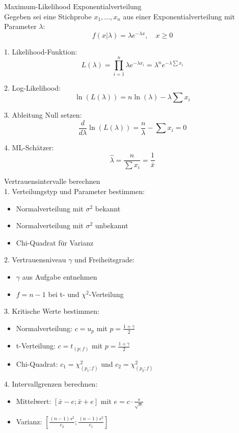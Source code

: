 \begin{example2}{Maximum-Likelihood Exponentialverteilung}\\
Gegeben sei eine Stichprobe $x_1,...,x_n$ aus einer Exponentialverteilung mit Parameter $\lambda$:
$$f(x|\lambda) = \lambda e^{-\lambda x}, \quad x \geq 0$$

1. Likelihood-Funktion:
$$L(\lambda) = \prod_{i=1}^n \lambda e^{-\lambda x_i} = \lambda^n e^{-\lambda \sum x_i}$$

2. Log-Likelihood:
$$\ln(L(\lambda)) = n\ln(\lambda) - \lambda \sum x_i$$

3. Ableitung Null setzen:
$$\frac{d}{d\lambda}\ln(L(\lambda)) = \frac{n}{\lambda} - \sum x_i = 0$$

4. ML-Schätzer:
$$\hat{\lambda} = \frac{n}{\sum x_i} = \frac{1}{\bar{x}}$$
\end{example2}

\begin{KR}{Vertrauensintervalle berechnen}\\
1. Verteilungstyp und Parameter bestimmen:
   \begin{itemize}
     \item Normalverteilung mit $\sigma^2$ bekannt
     \item Normalverteilung mit $\sigma^2$ unbekannt
     \item Chi-Quadrat für Varianz
   \end{itemize}

2. Vertrauensniveau $\gamma$ und Freiheitsgrade:
   \begin{itemize}
     \item $\gamma$ aus Aufgabe entnehmen
     \item $f = n-1$ bei t- und $\chi^2$-Verteilung
   \end{itemize}

3. Kritische Werte bestimmen:
   \begin{itemize}
     \item Normalverteilung: $c = u_p$ mit $p = \frac{1+\gamma}{2}$
     \item t-Verteilung: $c = t_{(p;f)}$ mit $p = \frac{1+\gamma}{2}$
     \item Chi-Quadrat: $c_1 = \chi^2_{(p_1;f)}$ und $c_2 = \chi^2_{(p_2;f)}$
   \end{itemize}

4. Intervallgrenzen berechnen:
   \begin{itemize}
     \item Mittelwert: $[\bar{x} - e; \bar{x} + e]$ mit $e = c \cdot \frac{s}{\sqrt{n}}$
     \item Varianz: $[\frac{(n-1)s^2}{c_2}; \frac{(n-1)s^2}{c_1}]$
   \end{itemize}
\end{KR}

